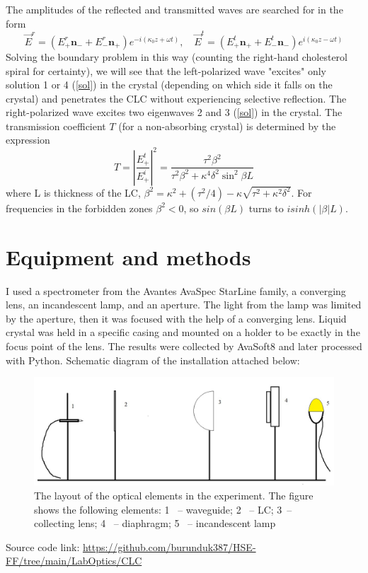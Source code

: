 \documentclass[a4paper, 12pt]{article}
\begin{document}
The amplitudes of the reflected and transmitted waves are searched for in the form
\begin{equation}
\overrightarrow{E}^{r}=\left(E_{+}^{r} \mathbf{n}_{-}+E_{-}^{r} \mathbf{n}_{+}\right) e^{-i\left(\kappa_{0} z+\omega t\right)}, \quad \overrightarrow{E}^{t}=\left(E_{+}^{t} \mathbf{n}_{+}+E_{-}^{t} \mathbf{n}_{-}\right) e^{i\left(\kappa_{0} z-\omega t\right)}
\end{equation}
Solving the boundary problem in this way (counting the right-hand cholesterol spiral for certainty), we will see that the left-polarized wave "excites" only solution 1 or 4  (\ref{sol}) in the crystal (depending on which side it falls on the crystal) and penetrates the CLC without experiencing selective reflection. The right-polarized wave excites two eigenwaves 2 and 3 (\ref{sol}) in the crystal.
The transmission coefficient $T$ (for a non-absorbing crystal) is determined by the expression
\begin{equation}
T=\left|\frac{E_{+}^{t}}{E_{+}^{i}}\right|^{2}=\frac{\tau^{2} \beta^{2}}{\tau^{2} \beta^{2}+\kappa^{4} \delta^{2} \sin ^{2} \beta L}
\end{equation}
where L is thickness of the LC, $\beta^{2}=\kappa^{2}+\left(\tau^{2} / 4\right)-\kappa \sqrt{\tau^{2}+\kappa^{2} \delta^{2}}$. For frequencies in the forbidden zones $\beta^{2} < 0$, so $sin(\beta L)$ turns to $i sinh(|\beta| L)$. \cite{bel}
\section*{Equipment and methods}
I used a spectrometer from the Avantes AvaSpec StarLine family, a converging lens, an incandescent lamp, and an aperture. The light from the lamp was limited by the aperture, then it was focused with the help of a converging lens. Liquid crystal was held in a specific casing and mounted on a holder to be exactly in the focus point of the lens. The results were collected by AvaSoft8 and later processed with Python. Schematic diagram of the installation attached below:
\begin{figure}[H]
\centering
\includegraphics[width=1\linewidth]{Principle.jpg}
\caption{The layout of the optical elements in the experiment. The figure shows the following elements: 1~ -- waveguide; 2~ -- LC; 3~-- collecting lens; 4~ -- diaphragm; 5~ -- incandescent lamp}
\label{fig:2}
\end{figure}
Source code link: \href{https://github.com/burunduk387/HSE-FF/tree/main/LabOptics/CLC}{https://github.com/burunduk387/HSE-FF/tree/main/LabOptics/CLC}
\end{document}
